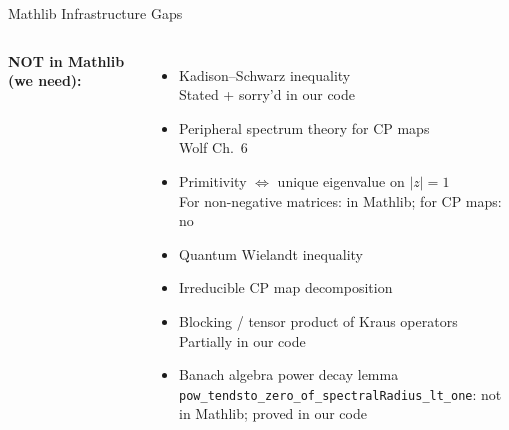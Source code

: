 \documentclass[aspectratio=169,10pt]{beamer}
\begin{document}
\begin{frame}{Mathlib Infrastructure Gaps}
    \vspace{-0.5em}

    \begin{columns}[T]
        \textbf{\textcolor{softred}{NOT in Mathlib} (we need):}
        \begin{itemize}\itemsep0.15em\small
            \item[\textcolor{softred}{$\boldsymbol\times$}] Kadison--Schwarz inequality\\
                  {\tiny Stated + sorry'd in our code}
            \item[\textcolor{softred}{$\boldsymbol\times$}] Peripheral spectrum theory for CP maps\\
                  {\tiny Wolf Ch.~6~\cite{Wolf2012Quantum}}
            \item[\textcolor{softred}{$\boldsymbol\times$}] Primitivity $\Leftrightarrow$ unique eigenvalue on $|z|{=}1$\\
                  {\tiny For non-negative matrices: in Mathlib; for CP maps: no}
            \item[\textcolor{softred}{$\boldsymbol\times$}] Quantum Wielandt inequality\\
                  {\tiny \cite{Sanz2010Quantum}}
            \item[\textcolor{softred}{$\boldsymbol\times$}] Irreducible CP map decomposition
            \item[\textcolor{softred}{$\boldsymbol\times$}] Blocking / tensor product of Kraus operators\\
                  {\tiny Partially in our code}
            \item[\textcolor{amber}{$\circ$}] Banach algebra power decay lemma\\
                  {\tiny \texttt{pow\_tendsto\_zero\_of\_spectralRadius\_lt\_one}: not in Mathlib; proved in our code}
        \end{itemize}


\end{columns}
\end{frame}
\end{document}
